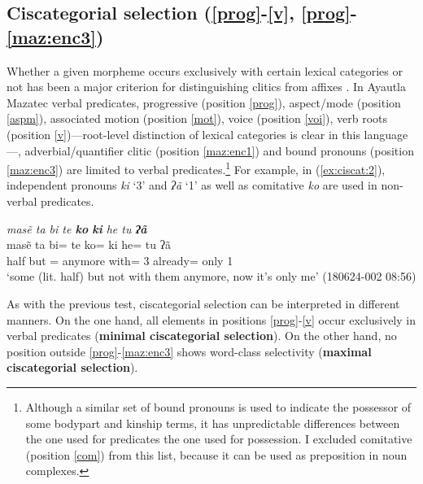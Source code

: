 \documentclass[output=paper]{langscibook}
\begin{document}
\subsection{Ciscategorial selection (\ref{prog}-\ref{v}, \ref{prog}-\ref{maz:enc3})}\label{sec:d:select}
Whether a given morpheme occurs exclusively with certain lexical categories or not has been a major criterion for distinguishing clitics from affixes \citep[cf.][45]{haspelmathword:2011}. In Ayautla Mazatec verbal predicates, progressive (position \ref{prog}), aspect/mode (position \ref{aspm}), associated motion (position \ref{mot}), voice (position \ref{voi}), verb roots (position \ref{v})—root-level distinction of lexical categories is clear in this language—, %
adverbial/quantifier clitic (position \ref{maz:enc1}) and bound pronouns (position  \ref{maz:enc3}) are limited to verbal predicates.\footnote{Although a similar set of bound pronouns is used to indicate the possessor of some bodypart and kinship terms, it has unpredictable differences between the one used for predicates the one used for possession. I excluded comitative (position \ref{com}) from this list, because it can be used as preposition in noun complexes.} For example, in (\ref{ex:ciscat:2}), independent pronouns \textit{k\lab{}i\2} `\Pronom{}3' and \textit{ʔã\2} `\Pronom{}1\Sg' as well as comitative \textit{ko\1\3} are used in non-verbal predicates.

\ea \label{ex:ciscat:2}
\textit{ma\2\st{}sẽ\2 ta\1\2 bi\4 \ssn te\1 \textbf{ko\1\3} \textbf{\st{}k\lab{}i\2} he\2\ff{} tu\1 \textbf{\st{}ʔã\2}}\\
\gll {} ma\2sẽ\2 ta\1\2 bi\4= \ssn te\1 ko\1\3= k\lab{}i\2 he\2= tu\1 ʔã\2\\
{} half but \Neg= anymore with= \Pronom{}3 already= only \Pronom{}1\Sg\\
\glt `some (lit. half) but not with them anymore, now it's only me' (180624-002 08:56)
\z

As with the previous test, ciscategorial selection can be interpreted in different manners. On the one hand, all elements in positions \ref{prog}-\ref{v} occur exclusively in verbal predicates (\textbf{minimal ciscategorial selection}). On the other hand, no position outside \ref{prog}-\ref{maz:enc3} shows word-class selectivity (\textbf{maximal ciscategorial selection}).
\end{document}
